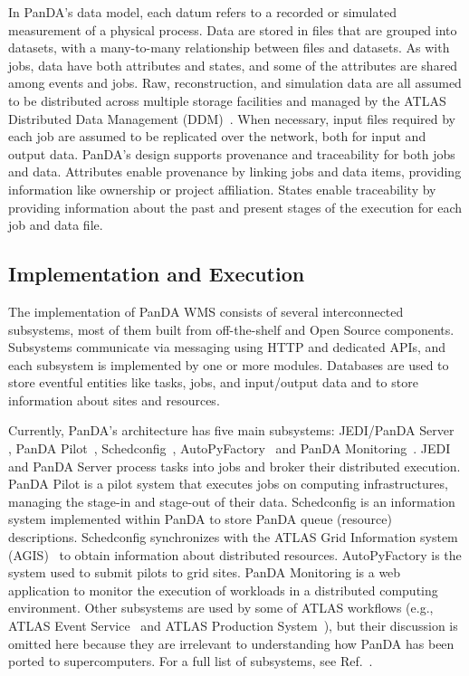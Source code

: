 In PanDA's data model, each datum refers to a recorded or simulated measurement
of a physical process. Data are stored in files that are grouped into datasets,
with a many-to-many relationship between files and datasets. As with jobs, data
have both attributes and states, and some of the attributes are shared among
events and jobs. Raw, reconstruction, and simulation data are all assumed to be
distributed across multiple storage facilities and managed by the ATLAS
Distributed Data Management (DDM)~\cite{garonne2012atlas}. When necessary,
input files required by each job are assumed to be replicated over the network,
both for input and output data. PanDA's design supports provenance and
traceability for both jobs and data. Attributes enable provenance by linking
jobs and data items, providing information like ownership or project
affiliation. States enable traceability by providing information about the past
and present stages of the execution for each job and data file.

\subsection{Implementation and Execution}
\label{subsec:implementation}

The implementation of PanDA WMS consists of several interconnected
subsystems, most of them built from off-the-shelf and Open Source components.
Subsystems communicate via messaging using HTTP and dedicated APIs, and each
subsystem is implemented by one or more modules. Databases are used to store
eventful entities like tasks, jobs, and input/output data and to store
information about sites and resources.

Currently, PanDA's architecture has five main subsystems: JEDI/PanDA Server~
\cite{maeno2011overview,borodin2015scaling}, PanDA
Pilot~\cite{nilsson2011atlas}, Schedconfig~\cite{nilsson2008panda},
AutoPyFactory~\cite{caballero2012autopyfactory} and PanDA
Monitoring~\cite{klimentov2011atlas}. JEDI and PanDA Server process tasks into
jobs and broker their distributed execution. PanDA Pilot is a pilot system that
executes jobs on computing infrastructures, managing the stage-in and stage-out
of their data. Schedconfig is an information system implemented within PanDA to
store PanDA queue (resource) descriptions.  Schedconfig synchronizes with the
ATLAS Grid Information system (AGIS)~\cite{anisenkov2014agis} to obtain
information about distributed resources. AutoPyFactory is the system used to
submit pilots to grid sites. PanDA Monitoring is a web application to monitor
the execution of workloads in a distributed computing environment. Other
subsystems are used by some of ATLAS workflows (e.g., ATLAS Event
Service~\cite{calafiura2015atlas} and ATLAS Production
System~\cite{borodin2016atlas}), but their discussion is omitted here because
they are irrelevant to understanding how PanDA has been ported to
supercomputers. For a full list of subsystems, see Ref.~\cite{panda-wiki_url}.

